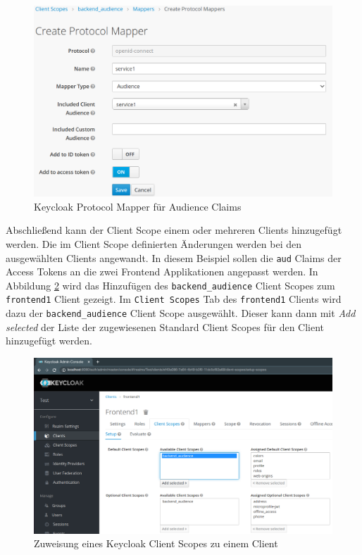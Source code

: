 \begin{figure}[!ht]
	\centering
	\includegraphics[width=1\textwidth]{Images/EbertScherer/KeycloakNewAudProtocolMapper.PNG}
	\caption{Keycloak Protocol Mapper für Audience Claims}
	\label{fig:EB_Keycloak Protocol Mapper für Audience Claim}
\end{figure}

Abschließend kann der Client Scope einem oder mehreren Clients hinzugefügt werden. Die im Client Scope definierten Änderungen werden bei den ausgewählten Clients angewandt. In diesem Beispiel sollen die \texttt{aud} Claims der Access Tokens an die zwei Frontend Applikationen angepasst werden. In Abbildung \ref{fig:EB_Keycloak Client Scope einem Client zuweisen} wird das Hinzufügen des \texttt{backend\_audience} Client Scopes zum \texttt{frontend1} Client gezeigt. Im \texttt{Client Scopes} Tab des \texttt{frontend1} Clients wird dazu der \texttt{backend\_audience} Client Scope ausgewählt. Dieser kann dann mit \textit{Add selected} der Liste der zugewiesenen Standard Client Scopes für den Client hinzugefügt werden.

\begin{figure}[!ht]
	\centering
	\includegraphics[width=1\textwidth]{Images/EbertScherer/KeycloakAddAudClientScope.PNG}
	\caption{Zuweisung eines Keycloak Client Scopes zu einem Client}
	\label{fig:EB_Keycloak Client Scope einem Client zuweisen}
\end{figure}

